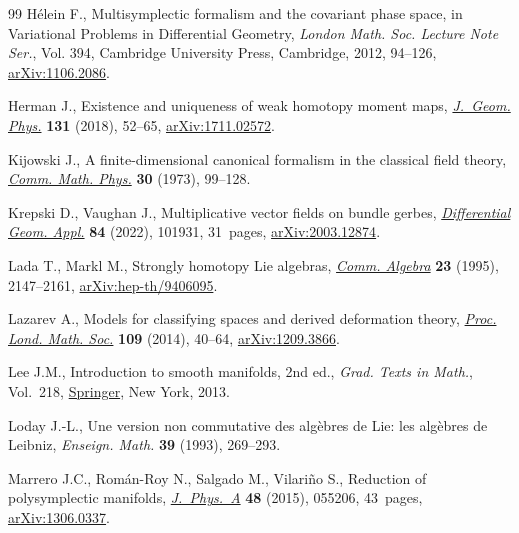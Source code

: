 \documentclass[pdftex]{sigma}
\numberwithin{equation}{section}
\begin{document}
\begin{thebibliography}{99}
H\'elein F., Multisymplectic formalism and the covariant phase space, in
  Variational Problems in Differential Geometry, \textit{London Math. Soc.
  Lecture Note Ser.}, Vol. 394, Cambridge University Press, Cambridge, 2012,
  94--126, \href{https://arxiv.org/abs/1106.2086}{arXiv:1106.2086}.

Herman J., Existence and uniqueness of weak homotopy moment maps,
  \href{https://doi.org/10.1016/j.geomphys.2018.05.001}{\textit{J.~Geom. Phys.}} \textbf{131} (2018), 52--65, \href{https://arxiv.org/abs/1711.02572}{arXiv:1711.02572}.

Kijowski J., A finite-dimensional canonical formalism in the classical field
  theory, \href{https://doi.org/10.1007/BF01645975}{\textit{Comm. Math. Phys.}} \textbf{30} (1973), 99--128.

Krepski D., Vaughan J., Multiplicative vector fields on bundle gerbes,
  \href{https://doi.org/10.1016/j.difgeo.2022.101931}{\textit{Differential Geom. Appl.}} \textbf{84} (2022), 101931, 31~pages,
  \href{https://arxiv.org/abs/2003.12874}{arXiv:2003.12874}.

Lada T., Markl M., Strongly homotopy {L}ie algebras, \href{https://doi.org/10.1080/00927879508825335}{\textit{Comm. Algebra}}
  \textbf{23} (1995), 2147--2161, \href{https://arxiv.org/abs/hep-th/9406095}{arXiv:hep-th/9406095}.

Lazarev A., Models for classifying spaces and derived deformation theory,
  \href{https://doi.org/10.1112/plms/pdt069}{\textit{Proc. Lond. Math. Soc.}} \textbf{109} (2014), 40--64,
  \href{https://arxiv.org/abs/1209.3866}{arXiv:1209.3866}.

Lee J.M., Introduction to smooth manifolds, 2nd ed., \textit{Grad. Texts in Math.}, Vol.~218, \href{https://doi.org/10.1007/978-1-4419-9982-5}{Springer}, New York, 2013.

Loday J.-L., Une version non commutative des alg\`ebres de {L}ie: les alg\`ebres
  de {L}eibniz, \textit{Enseign. Math.} \textbf{39} (1993), 269--293.

Marrero J.C., Rom\'an-Roy N., Salgado M., Vilari\~no S., Reduction of
  polysymplectic manifolds, \href{https://doi.org/10.1088/1751-8113/48/5/055206}{\textit{J.~Phys.~A}} \textbf{48} (2015), 055206,
  43~pages, \href{https://arxiv.org/abs/1306.0337}{arXiv:1306.0337}.


\end{thebibliography}
\end{document}
